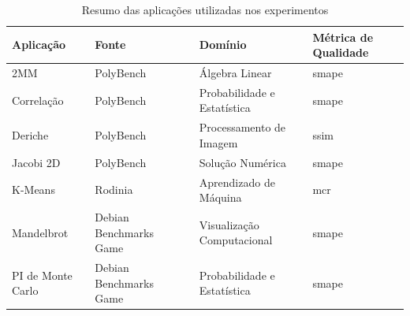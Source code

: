 \begin{table}[htb]
	\centering
	\begin{tabular}{|l|p{3.5cm}|l|l|}
		\hline
		\textbf{Aplicação} & \textbf{Fonte}                                     & \textbf{Domínio}            & \textbf{Métrica de Qualidade} \\
		\hline
		2MM                & PolyBench~\cite{polybench}                         & Álgebra Linear              & \gls{smape}                   \\
		\hline
		Correlação         & PolyBench~\cite{polybench}                         & Probabilidade e Estatística & \gls{smape}                   \\
		\hline
		Deriche            & PolyBench~\cite{polybench}                         & Processamento de Imagem     & \gls{ssim}                    \\
		\hline
		Jacobi 2D          & PolyBench~\cite{polybench}                         & Solução Numérica            & \gls{smape}                   \\
		\hline
		K-Means            & Rodinia~\cite{rodinia}                             & Aprendizado de Máquina      & \gls{mcr}                     \\
		\hline
		Mandelbrot         & Debian Benchmarks Game~\cite{debianBenchmarksGame} & Visualização Computacional  & \gls{smape}                   \\
		\hline
		PI de Monte Carlo  & Debian Benchmarks Game~\cite{debianBenchmarksGame} & Probabilidade e Estatística & \gls{smape}                   \\
		\hline
	\end{tabular}
	\fonte{}
	\caption{Resumo das aplicações utilizadas nos experimentos}
	\label{tab:benchmarks}
\end{table}
